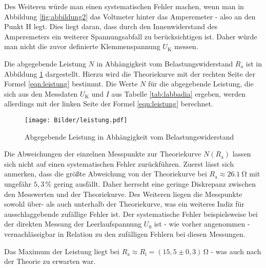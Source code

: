 Des Weiteren würde man einen systematischen Fehler machen, wenn man in Abbildung \ref{fig:abbildung2} das Voltmeter hinter das Amperemeter - also an den Punkt H legt.
Dies liegt daran, dass durch den Innenwiderstand des Amperemeters ein weiterer Spannungsabfall zu berücksichtigen ist. Daher würde man nicht die zuvor definierte Klemmenspannung $U_{\text{K}}$ messen.

Die abgegebende Leistung $N$ in Abhängigkeit vom Belastungswiderstand $R_{\text{a}}$ ist in Abbildung \ref{fig:aufe} dargestellt.
Hierzu wird die Theoriekurve mit der rechten Seite der Formel \eqref{eqn:leistung} bestimmt.
Die Werte $N$ für die abgegebende Leistung, die sich aus den Messdaten $U_{\text{K}}$ und $I$ aus Tabelle \ref{tab:labbadia} ergeben, werden allerdings mit der linken Seite der Formel \eqref{eqn:leistung} berechnet.
\begin{figure}
\texttt{[image: Bilder/leistung.pdf]}
\caption{Abgegebende Leistung in Abhängigkeit vom Belastungswiderstand}
\label{fig:aufe}
\end{figure}
Die Abweichungen der einzelnen Messpunkte zur Theoriekurve $N(R_{\text{a}})$ lassen sich nicht auf einen systematischen Fehler zurückführen.
Zuerst lässt sich anmerken, dass die größte Abweichung von der Theoriekurve bei $R_{\text{a}} \approx \SI{26,1}{\ohm}$ mit ungefähr $5,3 \, \%$ gering ausfällt. Daher herrscht eine geringe Diskrepanz zwischen den Messwerten und der Theoriekurve.
Des Weiteren liegen die Messpunkte sowohl über- als auch unterhalb der Theoriekurve, was ein weiteres Indiz für ausschlaggebende zufällige Fehler ist.
Der systematische Fehler beispielsweise bei der direkten Messung der Leerlaufspannung $U_0$ ist - wie vorher angenommen - vernachlässigbar in Relation zu den zufälligen Fehlern bei diesen Messungen.

Das Maximum der Leistung liegt bei $R_{\text{a}} \approx R_{\text{i}} = (15,5 \pm 0,3) \, \si{\ohm}$ - was auch nach der Theorie zu erwarten war.
